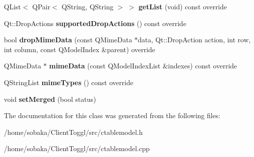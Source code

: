 \begin{DoxyCompactItemize}
\item 
\mbox{\label{classCTableModel_ab74d634e24320e633cff015dde6c3cf8}} 
Q\+List$<$ Q\+Pair$<$ Q\+String, Q\+String $>$ $>$ {\bfseries get\+List} (void) const override
\item 
\mbox{\label{classCTableModel_ae665d7b9fdde310e94190bd733fd3e24}} 
Qt\+::\+Drop\+Actions {\bfseries supported\+Drop\+Actions} () const override
\item 
\mbox{\label{classCTableModel_a31fa1543ac06e831d0493e1ead1eeb1a}} 
bool {\bfseries drop\+Mime\+Data} (const Q\+Mime\+Data $\ast$data, Qt\+::\+Drop\+Action action, int row, int column, const Q\+Model\+Index \&parent) override
\item 
\mbox{\label{classCTableModel_a0b9525472c017cbde759a13feecd7182}} 
Q\+Mime\+Data $\ast$ {\bfseries mime\+Data} (const Q\+Model\+Index\+List \&indexes) const override
\item 
\mbox{\label{classCTableModel_aad5aa3a7eb4549fd3529d7238d3a1389}} 
Q\+String\+List {\bfseries mime\+Types} () const override
\item 
\mbox{\label{classCTableModel_a4359887b8e4d9e9ed5bd840fd236c54a}} 
void {\bfseries set\+Merged} (bool status)
\end{DoxyCompactItemize}


The documentation for this class was generated from the following files\+:\begin{DoxyCompactItemize}
\item 
/home/sobaka/\+Client\+Toggl/src/ctablemodel.\+h\item 
/home/sobaka/\+Client\+Toggl/src/ctablemodel.\+cpp\end{DoxyCompactItemize}
